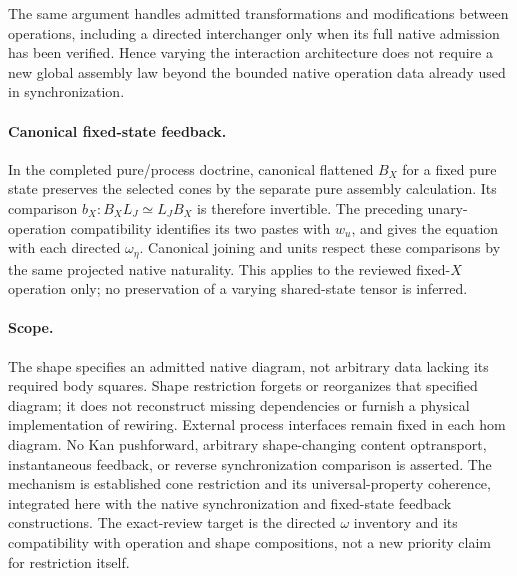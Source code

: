 \documentclass{article}
\begin{document}
The same argument handles admitted transformations and modifications between operations, including a directed interchanger only when its full native admission has been verified. Hence varying the interaction architecture does not require a new global assembly law beyond the bounded native operation data already used in synchronization.

\paragraph{Canonical fixed-state feedback.} In the completed pure/process doctrine, canonical flattened $B_X$ for a fixed pure state preserves the selected cones by the separate pure assembly calculation. Its comparison $b_X:B_XL_J\simeq L_JB_X$ is therefore invertible. The preceding unary-operation compatibility identifies its two pastes with $w_u$, and gives the equation with each directed $\omega_\eta$. Canonical joining and units respect these comparisons by the same projected native naturality. This applies to the reviewed fixed-$X$ operation only; no preservation of a varying shared-state tensor is inferred.

\paragraph{Scope.} The shape specifies an admitted native diagram, not arbitrary data lacking its required body squares. Shape restriction forgets or reorganizes that specified diagram; it does not reconstruct missing dependencies or furnish a physical implementation of rewiring. External process interfaces remain fixed in each hom diagram. No Kan pushforward, arbitrary shape-changing content optransport, instantaneous feedback, or reverse synchronization comparison is asserted. The mechanism is established cone restriction and its universal-property coherence, integrated here with the native synchronization and fixed-state feedback constructions. The exact-review target is the directed $\omega$ inventory and its compatibility with operation and shape compositions, not a new priority claim for restriction itself.
\end{document}
